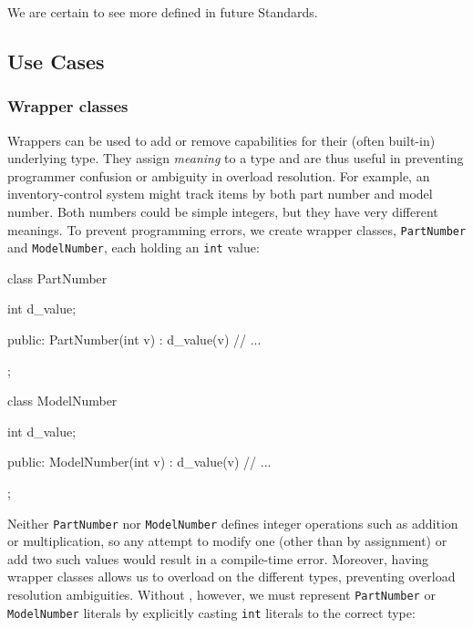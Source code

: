 \noindent We are certain to see more  defined in future
Standards.

\subsection[Use Cases]{Use Cases}\label{use-cases-userdeflit}

\subsubsection[Wrapper classes]{Wrapper classes}\label{wrapper-classes}

Wrappers can be used to add or remove capabilities for their (often
built-in) underlying type. They assign \emph{meaning} to a type and are
thus useful in preventing programmer confusion or ambiguity in overload
resolution. For example, an inventory-control system might track items
by both part number and model number. Both numbers could be simple
integers, but they have very different meanings. To prevent programming
errors, we create wrapper classes, \lstinline!PartNumber! and
\lstinline!ModelNumber!, each holding an \lstinline!int! value:

\begin{emcppslisting}
class PartNumber
{
    int d_value;

public:
    PartNumber(int v) : d_value(v) { }
    // ...
};

class ModelNumber
{
    int d_value;

public:
    ModelNumber(int v) : d_value(v) { }
    // ...
};
\end{emcppslisting}
    
\noindent Neither \lstinline!PartNumber! nor \lstinline!ModelNumber! defines integer
operations such as addition or multiplication, so any attempt to modify
one (other than by assignment) or add two such values would result in a
compile-time error. Moreover, having wrapper classes allows us to
overload on the different types, preventing overload resolution
ambiguities. Without , however, we must represent
\lstinline!PartNumber! or \lstinline!ModelNumber! literals by explicitly
casting \lstinline!int! literals to the correct type:

